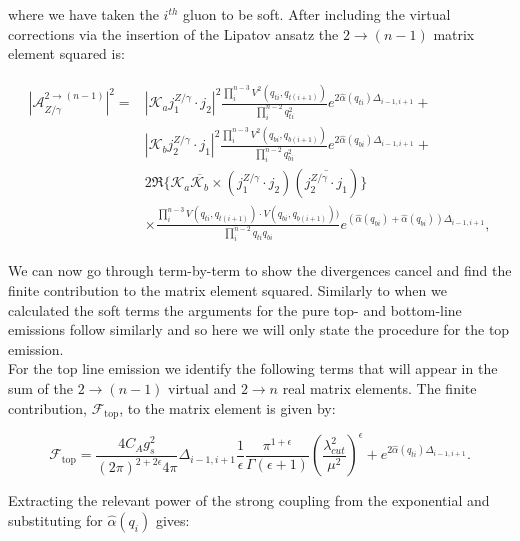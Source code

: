 		where we have taken the $i^{th}$ gluon to be soft.  After including the virtual corrections
		via the insertion of the Lipatov ansatz the $2\rightarrow (n-1)$ matrix element squared is:

		\begin{align}
		\begin{split}
			|\mathcal{A}_{Z/\gamma}^{2\rightarrow (n-1)}|^2 = &\left|\mathcal{K}_a j_1^{Z/\gamma}\cdot j_2\right|^2
				\frac{\prod^{n-3}_{i}V^2(q_{ti}, q_{t(i+1)})}{\prod^{n-2}_{i}q^2_{ti}}e^{2\hat{\alpha}(q_{ti})\Delta_{i-1,i+1}} + \\
				&\left|\mathcal{K}_b j_2^{Z/\gamma}\cdot j_1\right|^2 \frac{\prod^{n-3}_{i}V^2(q_{bi}, q_{b(i+1)})}
				{\prod^{n-2}_{i}q^2_{bi}}e^{2\hat{\alpha}(q_{bi})\Delta_{i-1,i+1}} + \\
				&2\Re\{\mathcal{K}_a\overline{\mathcal{K}_b} \times (j_1^{Z/\gamma}\cdot j_2)(\overline{j_2^{Z/\gamma}\cdot j_1})\}\\
				&\times\frac{\prod^{n-3}_{i}V(q_{ti}, q_{t(i+1)})\cdot V(q_{bi}, q_{b(i+1)}))}{\prod^{n-2}_{i}q_{ti}q_{bi}}
				e^{(\hat{\alpha}(q_{bi}) + \hat{\alpha}(q_{bi}))\Delta_{i-1,i+1}},
		\end{split}
		\end{align}

		We can now go through term-by-term to show the divergences cancel and find the finite contribution to
		the matrix element squared.  Similarly to when we calculated the soft terms the arguments for the pure
		top- and bottom-line emissions follow similarly and so here we will only state the procedure for
		the top emission.\\For the top line emission we identify the following terms that will appear in the
		sum of the $2\rightarrow (n-1)$ virtual and $2\rightarrow n$ real matrix elements.  The finite
		contribution, $\mathcal{F}_{\text{top}}$, to the matrix element is given by:

		\begin{equation}
			\mathcal{F}_{\text{top}} = \frac{4C_Ag_s^2}{(2\pi)^{2+2\epsilon}4\pi}\Delta_{i-1, i+1}
			\frac{1}{\epsilon}\frac{\pi^{1+\epsilon}}
			{\Gamma(\epsilon+1)}\left(\frac{\lambda_{cut}^2}{\mu^2}\right)^\epsilon +
			e^{2\hat{\alpha}(q_{ti})\Delta_{i-1,i+1}}.
		\end{equation}

		Extracting the relevant power of the strong coupling from the
		exponential and substituting for $\hat{\alpha}(q_i)$ gives:

